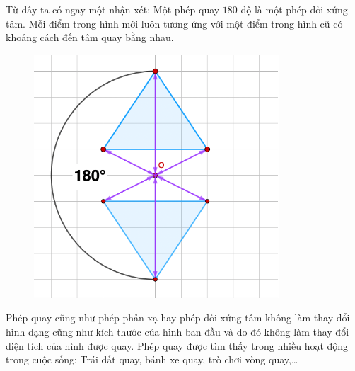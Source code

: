 \begin{multicols}{2}
\begin{figure}[H]
		\vspace*{-10pt}
	\end{figure}
	Từ đây ta có ngay một nhận xét: Một phép quay $180$ độ là một phép đối xứng tâm. Mỗi điểm trong hình mới luôn tương ứng với một điểm trong hình cũ có khoảng cách đến tâm quay bằng nhau.
	\begin{figure}[H]
		\vspace*{-5pt}
		\centering
		\captionsetup{labelformat= empty, justification=centering}
		\includegraphics[width= 1\linewidth]{Picture22}
		\vspace*{-10pt}
	\end{figure}
	Phép quay cũng như phép phản xạ hay phép đối xứng tâm không làm thay đổi hình dạng cũng như kích thước của hình ban đầu và do đó không làm thay đổi diện tích của hình được quay.
	\vskip 0.1cm
	Phép quay được tìm thấy trong nhiều hoạt động trong cuộc sống: Trái đất quay, bánh xe quay, trò chơi vòng quay,… 
	\begin{figure}[H]
		\vspace*{-5pt}
		\centering
		\captionsetup{labelformat= empty, justification=centering}

\end{figure}
\end{multicols}
